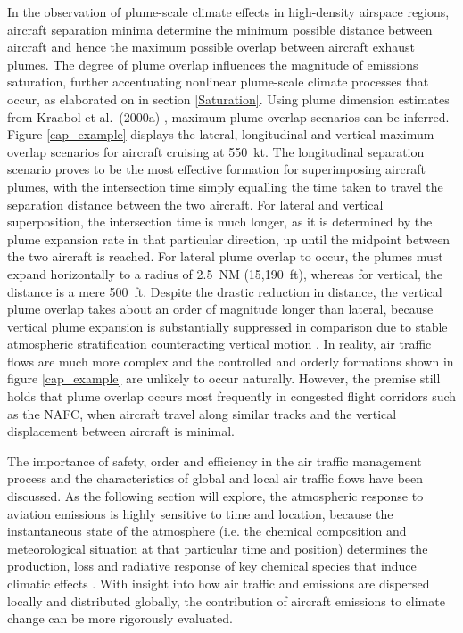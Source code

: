 In the observation of plume-scale climate effects in high-density airspace regions, aircraft separation minima determine the minimum possible distance between aircraft and hence the maximum possible overlap between aircraft exhaust plumes. The degree of plume overlap influences the magnitude of emissions saturation, further accentuating nonlinear plume-scale climate processes that occur, as elaborated on in section \ref{Saturation}. Using plume dimension estimates from Kraabol et al.\ (2000a) \cite{Kraabol2000a}, maximum plume overlap scenarios can be inferred. Figure \ref{cap_example} displays the lateral, longitudinal and vertical maximum overlap scenarios for aircraft cruising at 550~kt. The longitudinal separation scenario proves to be the most effective formation for superimposing aircraft plumes, with the intersection time simply equalling the time taken to travel the separation distance between the two aircraft. For lateral and vertical superposition, the intersection time is much longer, as it is determined by the plume expansion rate in that particular direction, up until the midpoint between the two aircraft is reached. For lateral plume overlap to occur, the plumes must expand horizontally to a radius of 2.5~NM (15,190~ft), whereas for vertical, the distance is a mere 500~ft. Despite the drastic reduction in distance, the vertical plume overlap takes about an order of magnitude longer than lateral, because vertical plume expansion is substantially suppressed in comparison due to stable atmospheric stratification counteracting vertical motion \cite{Schumann1995}. In reality, air traffic flows are much more complex and the controlled and orderly formations shown in figure \ref{cap_example} are unlikely to occur naturally. However, the premise still holds that plume overlap occurs most frequently in congested flight corridors such as the NAFC, when aircraft travel along similar tracks and the vertical displacement between aircraft is minimal. 

The importance of safety, order and efficiency in the air traffic management process and the characteristics of global and local air traffic flows have been discussed. As the following section will explore, the atmospheric response to aviation emissions is highly sensitive to time and location, because the instantaneous state of the atmosphere (i.e. the chemical composition and meteorological situation at that particular time and position) determines the production, loss and radiative response of key chemical species that induce climatic effects \cite{Jacobson2005}. With insight into how air traffic and emissions are dispersed locally and distributed globally, the contribution of aircraft emissions to climate change can be more rigorously evaluated.

